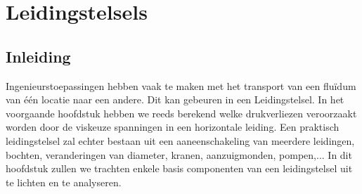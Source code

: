\FloatBarrier
\chapter{Leidingstelsels}
\label{sec:Leidingstelsels}

	\FloatBarrier
	\section{Inleiding}
	\label{sec:Leidingstelsels Inleiding}
Ingenieurstoepassingen hebben vaak te maken met het transport van een flu\"idum van \'e\'en locatie naar een andere. Dit kan gebeuren in een Leidingstelsel. In het voorgaande hoofdstuk hebben we reeds berekend welke drukverliezen veroorzaakt worden door de viskeuze spanningen in een horizontale leiding. Een praktisch leidingstelsel zal echter bestaan uit een aaneenschakeling van meerdere leidingen, bochten, veranderingen van diameter, kranen, aanzuigmonden, pompen,...
\npar
In dit hoofdstuk zullen we trachten enkele basis componenten van een leidingstelsel uit te lichten en te analyseren.
	\FloatBarrier
